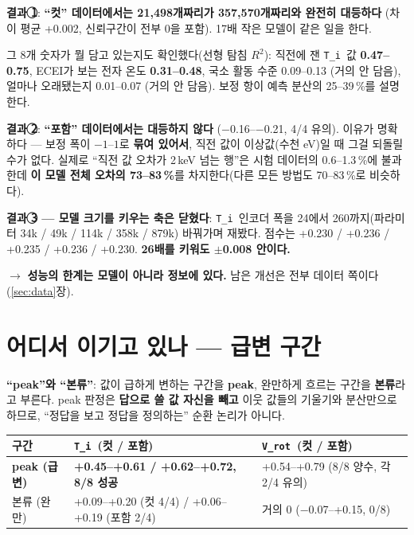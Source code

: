 \documentclass[10pt]{article}
\newcommand{\Ti}{\texttt{T\_i}}
\newcommand{\Vrot}{\texttt{V\_rot}}
\begin{document}
\textbf{결과 \textcircled{1}}: \textbf{``컷'' 데이터에서는 21{,}498개짜리가 357{,}570개짜리와
완전히 대등하다} (차이 평균 +0.002, 신뢰구간이 전부 0을 포함). 17배 작은 모델이 같은 일을 한다.

그 8개 숫자가 뭘 담고 있는지도 확인했다(선형 탐침 $R^2$): 직전에 잰 \Ti\ 값
\textbf{0.47--0.75}, ECEI가 보는 전자 온도 \textbf{0.31--0.48}, 국소 활동 수준 0.09--0.13
(거의 안 담음), 얼마나 오래됐는지 0.01--0.07 (거의 안 담음). 보정 항이 예측 분산의
25--39\,\%를 설명한다.

\textbf{결과 \textcircled{2}}: \textbf{``포함'' 데이터에서는 대등하지 않다}
($-$0.16--$-$0.21, 4/4 유의). 이유가 명확하다 --- 보정 폭이 $-1$--$1$로 \textbf{묶여
있어서}, 직전 값이 이상값(수천 eV)일 때 그걸 되돌릴 수가 없다. 실제로 ``직전 값 오차가
2\,keV 넘는 행''은 시험 데이터의 0.6--1.3\,\%에 불과한데 \textbf{이 모델 전체 오차의
73--83\,\%}를 차지한다(다른 모든 방법도 70--83\,\%로 비슷하다).

\textbf{결과 \textcircled{3} --- 모델 크기를 키우는 축은 닫혔다}: \Ti\ 인코더 폭을 24에서
260까지(파라미터 34k / 49k / 114k / 358k / 879k) 바꿔가며 재봤다. 점수는 +0.230 / +0.236 /
+0.235 / +0.236 / +0.230. \textbf{26배를 키워도 $\pm$0.008 안이다.}

$\rightarrow$ \textbf{성능의 한계는 모델이 아니라 정보에 있다.} 남은 개선은 전부 데이터
쪽이다(\ref{sec:data}장).

\section{어디서 이기고 있나 --- 급변 구간}

\textbf{``peak''와 ``본류''}: 값이 급하게 변하는 구간을 \textbf{peak}, 완만하게 흐르는
구간을 \textbf{본류}라고 부른다. peak 판정은 \textbf{답으로 쓸 값 자신을 빼고} 이웃 값들의
기울기와 분산만으로 하므로, ``정답을 보고 정답을 정의하는'' 순환 논리가 아니다.

\begin{center}
\begin{tabularx}{\textwidth}{@{}l L L@{}}
\toprule
\textbf{구간} & \textbf{\Ti\ (컷 / 포함)} & \textbf{\Vrot\ (컷 / 포함)} \\
\midrule
\textbf{peak (급변)} & \textbf{+0.45--+0.61 / +0.62--+0.72, 8/8 성공} &
  +0.54--+0.79 (8/8 양수, 각 2/4 유의) \\
본류 (완만) & +0.09--+0.20 (컷 4/4) / +0.06--+0.19 (포함 2/4) &
  거의 0 ($-$0.07--+0.15, 0/8) \\
\bottomrule
\end{tabularx}
\end{center}
\end{document}
